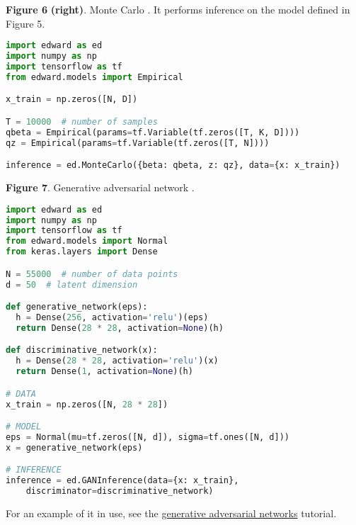 \textbf{Figure 6} \textbf{(right)}. Monte Carlo \citep{robert1999monte}.
It performs inference on the model defined in Figure 5.
\begin{lstlisting}[language=python]
import edward as ed
import numpy as np
import tensorflow as tf
from edward.models import Empirical

x_train = np.zeros([N, D])

T = 10000  # number of samples
qbeta = Empirical(params=tf.Variable(tf.zeros([T, K, D])))
qz = Empirical(params=tf.Variable(tf.zeros([T, N])))

inference = ed.MonteCarlo({beta: qbeta, z: qz}, data={x: x_train})
\end{lstlisting}

\textbf{Figure 7}. Generative adversarial network
\citep{goodfellow2014generative}.
\begin{lstlisting}[language=python]
import edward as ed
import numpy as np
import tensorflow as tf
from edward.models import Normal
from keras.layers import Dense

N = 55000  # number of data points
d = 50  # latent dimension

def generative_network(eps):
  h = Dense(256, activation='relu')(eps)
  return Dense(28 * 28, activation=None)(h)

def discriminative_network(x):
  h = Dense(28 * 28, activation='relu')(x)
  return Dense(1, activation=None)(h)

# DATA
x_train = np.zeros([N, 28 * 28])

# MODEL
eps = Normal(mu=tf.zeros([N, d]), sigma=tf.ones([N, d]))
x = generative_network(eps)

# INFERENCE
inference = ed.GANInference(data={x: x_train},
    discriminator=discriminative_network)
\end{lstlisting}
For an example of it in use, see the
\href{/tutorials/gan}{generative adversarial networks} tutorial.

